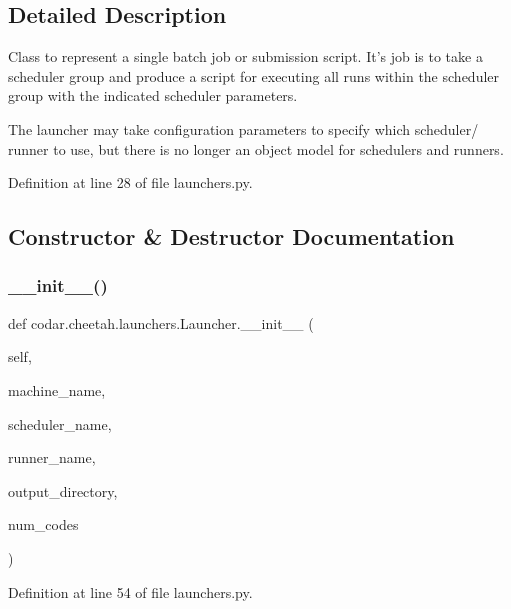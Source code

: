 \subsection{Detailed Description}
\begin{DoxyVerb}Class to represent a single batch job or submission script.
It's job is to take a scheduler group and produce a script for executing
all runs within the scheduler group with the indicated scheduler
parameters.

The launcher may take configuration parameters to specify which scheduler/
runner to use, but there is no longer an object model for schedulers and
runners.
\end{DoxyVerb}
 

Definition at line 28 of file launchers.\+py.



\subsection{Constructor \& Destructor Documentation}
\mbox{\label{classcodar_1_1cheetah_1_1launchers_1_1_launcher_a646b70e47e85def77f4ba1dbfbeb5b34}} 
\subsubsection{\texorpdfstring{\+\_\+\+\_\+init\+\_\+\+\_\+()}{\_\_init\_\_()}}
{\footnotesize\ttfamily def codar.\+cheetah.\+launchers.\+Launcher.\+\_\+\+\_\+init\+\_\+\+\_\+ (\begin{DoxyParamCaption}\item[{}]{self,  }\item[{}]{machine\+\_\+name,  }\item[{}]{scheduler\+\_\+name,  }\item[{}]{runner\+\_\+name,  }\item[{}]{output\+\_\+directory,  }\item[{}]{num\+\_\+codes }\end{DoxyParamCaption})}



Definition at line 54 of file launchers.\+py.



